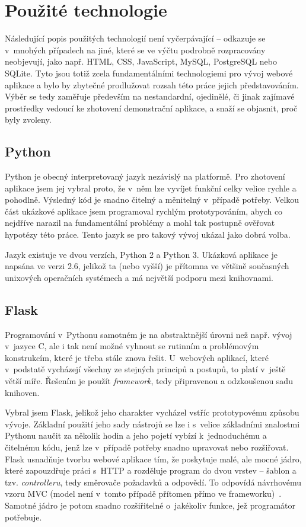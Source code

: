 \documentclass[12pt,oneside,final]{fithesis2}
\begin{document}
\section{Použité technologie}
Následující popis použitých technologií není vyčerpávající -- odkazuje se v~mnohých případech na jiné, které se ve výčtu podrobně rozpracovány neobjevují, jako např. HTML, CSS, JavaScript, MySQL, PostgreSQL nebo SQLite. Tyto jsou totiž zcela fundamentálními technologiemi pro vývoj webové aplikace a bylo by zbytečné prodlužovat rozsah této práce jejich představováním. Výběr se tedy zaměřuje především na nestandardní, ojedinělé, či jinak zajímavé prostředky vedoucí ke zhotovení demonstrační aplikace, a snaží se objasnit, proč byly zvoleny.

\subsection{Python}
Python je obecný interpretovaný jazyk nezávislý na platformě. Pro zhotovení aplikace jsem jej vybral proto, že v~něm lze vyvíjet funkční celky velice rychle a pohodlně. Výsledný kód je snadno čitelný a měnitelný v~případě potřeby. Velkou část ukázkové aplikace jsem programoval rychlým prototypováním, abych co nejdříve narazil na fundamentální problémy a mohl tak postupně ověřovat hypotézy této práce. Tento jazyk se pro takový vývoj ukázal jako dobrá volba.

Jazyk existuje ve dvou verzích, Python 2 a Python 3. Ukázková aplikace je napsána ve verzi 2.6, jelikož ta (nebo vyšší) je přítomna ve většině současných unixových operačních systémech a má největší podporu mezi knihovnami.

\subsection{Flask}
Programování v~Pythonu samotném je na abstraktnější úrovni než např. vývoj v~jazyce C, ale i tak není možné vyhnout se rutinním a problémovým konstrukcím, které je třeba stále znova řešit. U~webových aplikací, které v~podstatě vycházejí všechny ze stejných principů a postupů, to platí v~ještě větší míře. Řešením je použít \emph{framework}, tedy připravenou a odzkoušenou sadu knihoven.

Vybral jsem  Flask, jelikož jeho charakter vycházel vstříc prototypovému způsobu vývoje. Základní použití jeho sady nástrojů se lze i s~velice základními znalostmi Pythonu naučit za několik hodin a jeho pojetí vybízí k~jednoduchému a čitelnému kódu, jenž lze v~případě potřeby snadno upravovat nebo rozšiřovat. Flask usnadňuje tvorbu webové aplikace tím, že poskytuje malé, ale mocné jádro, které zapouzdřuje práci s~HTTP a rozděluje program do dvou vrstev -- šablon a tzv. \emph{controlleru}, tedy směrovače požadavků a odpovědí. To odpovídá návrhovému vzoru MVC (model není v~tomto případě přítomen přímo ve frameworku)~\cite{bernard2009serial}. Samotné jádro je potom snadno rozšiřitelné o~jakékoliv funkce, jež programátor potřebuje.
\end{document}
